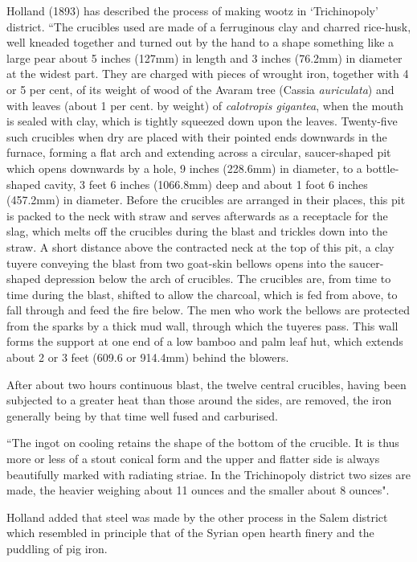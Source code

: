 Holland (1893) has described the process of making wootz in ‘Trichinopoly’ district. “The crucibles used are made of a ferruginous clay and charred rice-husk, well kneaded together and turned out by the hand to a shape something like a large pear about 5 inches (127mm) in length and 3 inches (76.2mm) in diameter at the widest part. They are charged with pieces of wrought iron, together with 4 or 5 per cent, of its weight of wood of the Avaram tree (Cassia {\it auriculata}) and with leaves (about 1 per cent. by weight) of {\it calotropis gigantea}, when the mouth is sealed with clay, which is tightly squeezed down upon the leaves. Twenty-five such crucibles when dry are placed with their pointed ends downwards in the furnace, forming a flat arch and extending across a circular, saucer-shaped pit which opens downwards by a hole, 9 inches (228.6mm) in diameter, to a bottle- shaped cavity, 3 feet 6 inches (1066.8mm) deep and about 1 foot 6 inches (457.2mm) in diameter. Before the crucibles are arranged in their places, this pit is packed to the neck with straw and serves afterwards as a receptacle for the slag, which melts off the crucibles during the blast and trickles down into the straw. A short distance above the contracted neck at the top of this pit, a clay tuyere conveying the blast from two goat-skin bellows opens into the saucer-shaped depression below the arch of crucibles. The crucibles are, from time to time during the blast, shifted to allow the charcoal, which is fed from above, to fall through and feed the fire below. The men who work the bellows are protected from the sparks by a thick mud wall, through which the tuyeres pass. This wall forms the support at one end of a low bamboo and palm leaf hut, which extends about 2 or 3 feet (609.6 or 914.4mm) behind the blowers.

After about two hours continuous blast, the twelve central crucibles, having been subjected to a greater heat than those around the sides, are removed, the iron generally being by that time well fused and carburised. 

{\footnotesize{``The ingot on cooling retains the shape of the bottom of the crucible. It is thus more or less of a stout conical form and the upper and flatter side is always beautifully marked with radiating striae. In the Trichinopoly district two sizes are made, the heavier weighing about 11 ounces and the smaller about 8 ounces".}}

Holland added that steel was made by the other process in the Salem district which resembled in principle that of the Syrian open hearth finery and the puddling of pig iron. 

